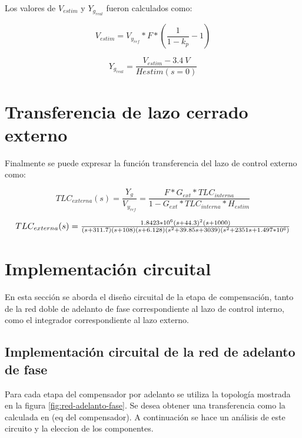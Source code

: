 Los valores de $V_{estim}$ y $Y_{g_{real}}$ fueron calculados como:

\begin{equation}
	V_{estim}=V_{y_{ref}}*F*(\frac{1}{1-k_p}-1)
\end{equation}

\begin{equation}
	Y_{g_{real}}=\frac{V_{estim}-3.4\:V}{H{estim}(s=0)}
\end{equation}


\section{Transferencia de lazo cerrado externo}

Finalmente se puede expresar la función transferencia del lazo de control externo como:

\begin{equation}
	TLC_{externa}(s)=\frac{Y_g}{V_{y_{ref}}}=\frac{F*G_{ext}*TLC_{interna}}{1-G_{ext}*TLC_{interna}*H_{estim}}
\end{equation}

\begin{equation*}
\resizebox{.99\hsize}{!}
{
$
TLC_{externa}(s)=\frac{1.8423*10^6 (s+44.3)^2 (s+1000)}{(s+311.7) (s+108) (s+6.128) (s^2 + 39.85s + 3039) (s^2 + 2351s + 1.497*10^6 )}
$
}
\end{equation*}


\section{Implementación circuital}

En esta sección se aborda el diseño circuital de la etapa de compensación, tanto de la red doble de adelanto de fase correspondiente al lazo de control interno, como el integrador correspondiente al lazo externo.

\subsection{Implementación circuital de la red de adelanto de fase}

Para cada etapa del compensador por adelanto se utiliza la topología mostrada en la figura \ref{fig:red-adelanto-fase}. Se desea obtener una transferencia como la calculada en (eq del compensador). A continuación se hace un análisis de este circuito y la eleccion de los componentes. 

